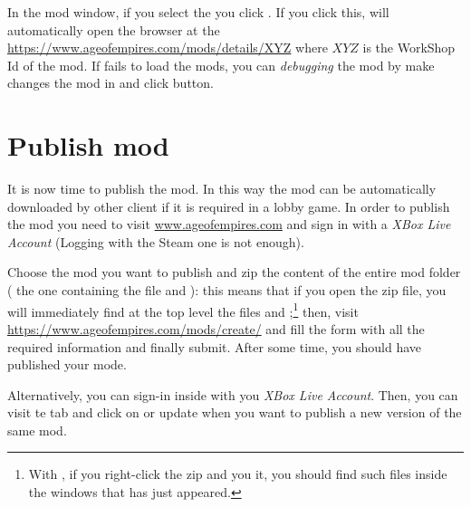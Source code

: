 In the mod window, if you select the  you click . If you click this, \aoe{} will automatically open the browser at the  \url{https://www.ageofempires.com/mods/details/XYZ} where $XYZ$ is the WorkShop Id of the mod. If \aoe{} fails to load the mods, you can \textit{debugging} the mod by make changes the mod in \aoehomelocaldir{} and click  button.

\section{Publish mod}

It is now time to publish the mod. In this way the mod can be automatically downloaded by other client if it is required in a lobby game. In order to publish the mod you need to visit \url{www.ageofempires.com} and sign in with a \textit{XBox Live Account} (Logging with the Steam one is not enough). 

Choose the mod you want to publish and zip the content of the entire mod folder (\ie{} the one containing the file  and ): this means that if you open the zip file, you will immediately find at the top level the files  and ;\footnote{With , if you right-click the zip and you  it, you should find such files inside the windows that has just appeared.} then, visit \url{https://www.ageofempires.com/mods/create/} and fill the form with all the required information and finally submit. After some time, you should have published your mode.

Alternatively, you can sign-in inside \aoe{} with you \textit{XBox Live Account}. Then, you can visit te  tab and click on  or update when you want to publish a new version of the same mod.
